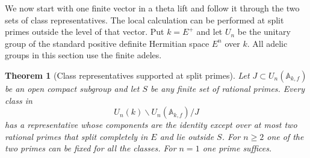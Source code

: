 \documentclass[a4paper,11pt]{article}
\newtheorem{theorem}[proposition]{Theorem}
\theoremstyle{definition}
\theoremstyle{remark}
\numberwithin{equation}{section}
\begin{document}
We now start with one finite vector in a theta lift and follow it
through the two sets of class representatives. The local calculation
can be performed at split primes outside the level of that vector.
Put \(k=E^+\) and let \(U_n\) be the unitary group of the standard
positive definite Hermitian space \(E^n\) over \(k\). All adelic
groups in this section use the finite adeles.

\begin{theorem}[Class representatives supported at split primes]\label{thm:class61}
Let \(J\subset U_n(\mathbb A_{k,f})\) be an open compact subgroup
and let \(S\) be any finite set of rational primes. Every class in
\[
                 U_n(k)\backslash U_n(\mathbb A_{k,f})/J
\]
has a representative whose components are the identity except
over at most two rational primes that split completely in \(E\)
and lie outside \(S\). For \(n\ge2\) one of the two primes can be
fixed for all the classes. For \(n=1\) one prime suffices.
\end{theorem}
\end{document}

